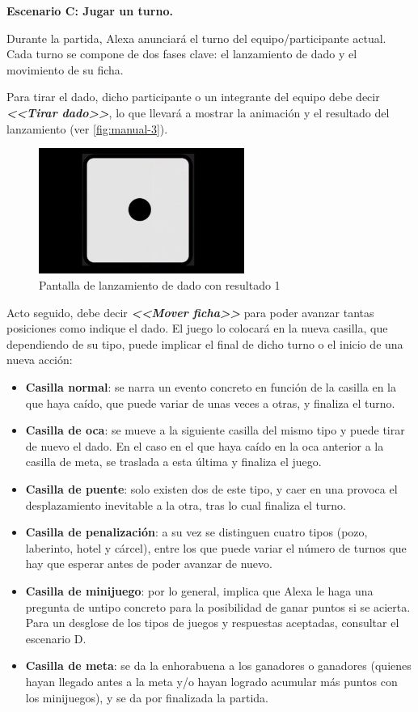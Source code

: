 \vspace{0.5cm}

\textbf{Escenario C: Jugar un turno.}

Durante la partida, Alexa anunciará el turno del equipo/participante actual. Cada turno se compone de dos fases clave: el lanzamiento de dado y el movimiento de su ficha.

Para tirar el dado, dicho participante o un integrante del equipo debe decir \textbf{\textit{<<Tirar dado>>}}, lo que llevará a mostrar la animación y el resultado del lanzamiento (ver \autoref{fig:manual-3}).

\begin{figure}[H]
	\centering
	\includegraphics[width=0.6\textwidth]{imgs/interfaz-3.JPG}
	\caption{Pantalla de lanzamiento de dado con resultado 1}
	\label{fig:manual-3}
\end{figure}

Acto seguido, debe decir \textbf{\textit{<<Mover ficha>>}} para poder avanzar tantas posiciones como indique el dado. El juego lo colocará en la nueva casilla, que dependiendo de su tipo, puede implicar el final de dicho turno o el inicio de una nueva acción:
 \begin{itemize}
 	\item \textbf{Casilla normal}: se narra un evento concreto en función de la casilla en la que haya caído, que puede variar de unas veces a otras, y finaliza el turno.
 	\item \textbf{Casilla de oca}: se mueve a la siguiente casilla del mismo tipo y puede tirar de nuevo el dado. En el caso en el que haya caído en la oca anterior a la casilla de meta, se traslada a esta última y finaliza el juego.
 	\item \textbf{Casilla de puente}: solo existen dos de este tipo, y caer en una provoca el desplazamiento inevitable a la otra, tras lo cual finaliza el turno. 
 	\item \textbf{Casilla de penalización}: a su vez se distinguen cuatro tipos (pozo, laberinto, hotel y cárcel), entre los que puede variar el número de turnos que hay que esperar antes de poder avanzar de nuevo.
 	\item \textbf{Casilla de minijuego}: por lo general, implica que Alexa le haga una pregunta de untipo concreto para la posibilidad de ganar puntos si se acierta. Para un desglose de los tipos de juegos y respuestas aceptadas, consultar el escenario D.
 	\item \textbf{Casilla de meta}: se da la enhorabuena a los ganadores o ganadores (quienes hayan llegado antes a la meta y/o hayan logrado acumular más puntos con los minijuegos), y se da por finalizada la partida.
 \end{itemize}

